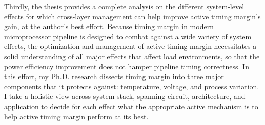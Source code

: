 Thirdly, the thesis provides a complete analysis on the different system-level effects for which cross-layer management can help improve active timing margin's gain, at the author's best effort. Because timing margin in modern microprocessor pipeline is designed to combat against a wide variety of system effects, the optimization and management of active timing margin necessitates a solid understanding of all major effects that affect load environments, so that the power efficiency improvement does not hamper pipeline timing correctness. In this effort, my Ph.D. research dissects timing margin into three major components that it protects against: temperature, voltage, and process variation. I take a holistic view across system stack, spanning circuit, architecture, and application to decide for each effect what the appropriate active mechanism is to help active timing margin perform at its best.

